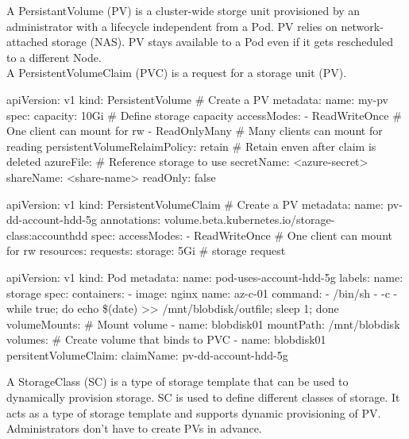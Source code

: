 \documentclass{refcard}
\begin{document}
A PersistantVolume (PV) is a cluster-wide storge unit provisioned by an administrator with a lifecycle independent from a Pod. PV relies on network-attached storage (NAS). PV stays available to a Pod even if it gets rescheduled to a different Node.\\
A PersistentVolumeClaim (PVC) is a request for a storage unit (PV).

\begin{yamlbox}[title={Defining a PV for Azure}]
  apiVersion: v1
  kind: PersistentVolume # Create a PV
  metadata:
    name: my-pv
  spec:
    capacity: 10Gi # Define storage capacity
    accessModes:
      - ReadWriteOnce # One client can mount for rw
      - ReadOnlyMany  # Many clients can mount for reading
    persistentVolumeRelaimPolicy: retain # Retain enven after claim is deleted
    azureFile: # Reference storage to use
      secretName: <azure-secret>
      shareName: <share-name>
      readOnly: false
\end{yamlbox}

\begin{yamlbox}[title={Defining a PVC}]
  apiVersion: v1
  kind: PersistentVolumeClaim # Create a PV
  metadata:
    name: pv-dd-account-hdd-5g
    annotations:
      volume.beta.kubernetes.io/storage-class:accounthdd
  spec:
    accessModes:
      - ReadWriteOnce # One client can mount for rw
      resources:
        requests:
          storage: 5Gi # storage request
\end{yamlbox}

\begin{yamlbox}[title={Using a PVC}]
  apiVersion: v1
  kind: Pod
  metadata:
    name: pod-uses-account-hdd-5g
    labels:
      name: storage
  spec:
    containers:
      - image: nginx
        name: az-c-01
        command:
        - /bin/sh
        - -c
        - while true; do echo \$(date) >>
          /mnt/blobdisk/outfile; sleep 1; done
      volumeMounts:  # Mount volume
      - name: blobdisk01
        mountPath: /mnt/blobdisk
    volumes: # Create volume that binds to PVC
    - name: blobdisk01
      persitentVolumeClaim:
        claimName: pv-dd-account-hdd-5g
\end{yamlbox}

A StorageClass (SC) is a type of storage template that can be used to dynamically provision storage. SC is used to define different classes of storage. It acts as a type of storage template and supports dynamic provisioning of PV. Administrators don't have to create PVs in advance.\\
\end{document}
